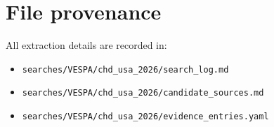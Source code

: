 \documentclass[11pt]{article}
\begin{document}
\section{File provenance}
All extraction details are recorded in:
\begin{itemize}[leftmargin=1.5em]
  \item \texttt{searches/VESPA/chd\_usa\_2026/search\_log.md}
  \item \texttt{searches/VESPA/chd\_usa\_2026/candidate\_sources.md}
  \item \texttt{searches/VESPA/chd\_usa\_2026/evidence\_entries.yaml}
\end{itemize}
\end{document}
